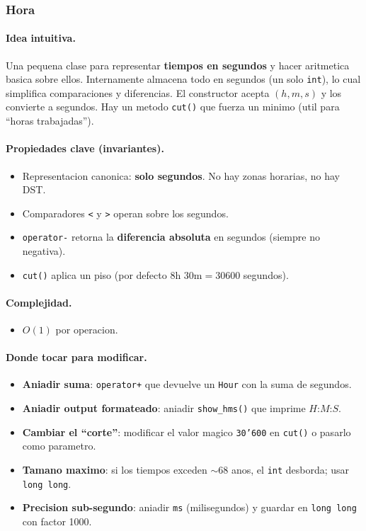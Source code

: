 ﻿\subsubsection{Hora}

\paragraph{Idea intuitiva.}
Una pequena clase para representar \textbf{tiempos en segundos} y hacer aritmetica basica sobre ellos. Internamente almacena todo en segundos (un solo \texttt{int}), lo cual simplifica comparaciones y diferencias. El constructor acepta $(h, m, s)$ y los convierte a segundos. Hay un metodo \texttt{cut()} que fuerza un minimo (util para ``horas trabajadas'').

\paragraph{Propiedades clave (invariantes).}
\begin{itemize}\setlength\itemsep{0pt}
	\item Representacion canonica: \textbf{solo segundos}. No hay zonas horarias, no hay DST.
	\item Comparadores \texttt{<} y \texttt{>} operan sobre los segundos.
	\item \texttt{operator-} retorna la \textbf{diferencia absoluta} en segundos (siempre no negativa).
	\item \texttt{cut()} aplica un piso (por defecto $8\text{h }30\text{m} = 30600$ segundos).
\end{itemize}

\paragraph{Complejidad.}
\begin{itemize}\setlength\itemsep{0pt}
	\item $O(1)$ por operacion.
\end{itemize}

\paragraph{Donde tocar para modificar.}
\begin{itemize}\setlength\itemsep{0pt}
	\item \textbf{Aniadir suma}: \texttt{operator+} que devuelve un \texttt{Hour} con la suma de segundos.
	\item \textbf{Aniadir output formateado}: aniadir \texttt{show\_hms()} que imprime $H$:$M$:$S$.
	\item \textbf{Cambiar el ``corte''}: modificar el valor magico \texttt{30'600} en \texttt{cut()} o pasarlo como parametro.
	\item \textbf{Tamano maximo}: si los tiempos exceden $\sim 68$ anos, el \texttt{int} desborda; usar \texttt{long long}.
	\item \textbf{Precision sub-segundo}: aniadir \texttt{ms} (milisegundos) y guardar en \texttt{long long} con factor 1000.
\end{itemize}

